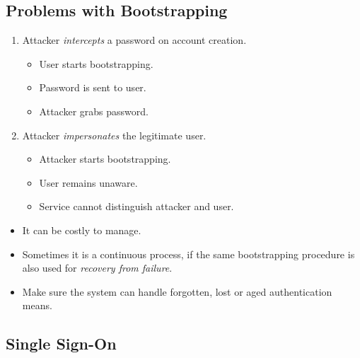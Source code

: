 \subsection{Problems with Bootstrapping}

\begin{frame}
  \begin{enumerate}
    \item Attacker \emph{intercepts} a password on account creation.
      \begin{itemize}
        \item User starts bootstrapping.
        \item Password is sent to user.
        \item Attacker grabs password.
      \end{itemize}

      \pause{}

    \item Attacker \emph{impersonates} the legitimate user.
      \begin{itemize}
        \item Attacker starts bootstrapping.
        \item User remains unaware.
        \item Service cannot distinguish attacker and user.
      \end{itemize}
  \end{enumerate}
\end{frame}

\begin{frame}
  \begin{itemize}
    \item It can be costly to manage.

    \item Sometimes it is a continuous process, if the same bootstrapping 
      procedure is also used for \emph{recovery from failure}.

    \item Make sure the system can handle forgotten, lost or aged 
      authentication means.

  \end{itemize}
\end{frame}

\subsection{Single Sign-On}

